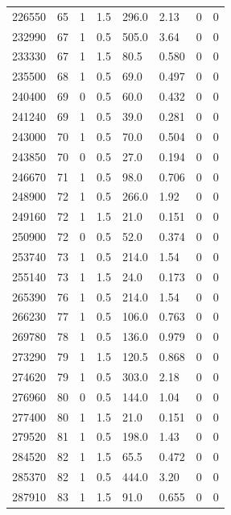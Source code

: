 \documentclass[preview]{standalone}
\begin{document}
{{{{{\begin{tabular}{L{1.2cm}C{1.2cm} C{0.3cm}C{0.5cm} C{1.4cm}C{1.4cm} C{1.4cm}C{1.4cm}}
  226550  &    65  & 1     & 1.5 &  296.0  & 2.13  & 0 &  0   \\ 
  232990  &    67  & 1     & 0.5 &  505.0  & 3.64  & 0 &  0   \\ 
  233330  &    67  & 1     & 1.5 &  80.5  & 0.580  & 0 &  0   \\ 
  235500  &    68  & 1     & 0.5 &  69.0  & 0.497  & 0 &  0   \\ 
  240400  &    69  & 0     & 0.5 &  60.0  & 0.432  & 0 &  0   \\ 
  241240  &    69  & 1     & 0.5 &  39.0  & 0.281  & 0 &  0   \\ 
  243000  &    70  & 1     & 0.5 &  70.0  & 0.504  & 0 &  0   \\ 
  243850  &    70  & 0     & 0.5 &  27.0  & 0.194  & 0 &  0   \\ 
  246670  &    71  & 1     & 0.5 &  98.0  & 0.706  & 0 &  0   \\ 
  248900  &    72  & 1     & 0.5 &  266.0  & 1.92  & 0 &  0   \\ 
  249160  &    72  & 1     & 1.5 &  21.0  & 0.151  & 0 &  0   \\ 
  250900  &    72  & 0     & 0.5 &  52.0  & 0.374  & 0 &  0   \\ 
  253740  &    73  & 1     & 0.5 &  214.0  & 1.54  & 0 &  0   \\ 
  255140  &    73  & 1     & 1.5 &  24.0  & 0.173  & 0 &  0   \\ 
  265390  &    76  & 1     & 0.5 &  214.0  & 1.54  & 0 &  0   \\ 
  266230  &    77  & 1     & 0.5 &  106.0  & 0.763  & 0 &  0   \\ 
  269780  &    78  & 1     & 0.5 &  136.0  & 0.979  & 0 &  0   \\ 
  273290  &    79  & 1     & 1.5 &  120.5  & 0.868  & 0 &  0   \\ 
  274620  &    79  & 1     & 0.5 &  303.0  & 2.18  & 0 &  0   \\ 
  276960  &    80  & 0     & 0.5 &  144.0  & 1.04  & 0 &  0   \\ 
  277400  &    80  & 1     & 1.5 &  21.0  & 0.151  & 0 &  0   \\ 
  279520  &    81  & 1     & 0.5 &  198.0  & 1.43  & 0 &  0   \\ 
  284520  &    82  & 1     & 1.5 &  65.5  & 0.472  & 0 &  0   \\ 
  285370  &    82  & 1     & 0.5 &  444.0  & 3.20  & 0 &  0   \\ 
  287910  &    83  & 1     & 1.5 &  91.0  & 0.655  & 0 &  0   \\ 
\hline 
\end{tabular} 

}}}}}
\end{document}
